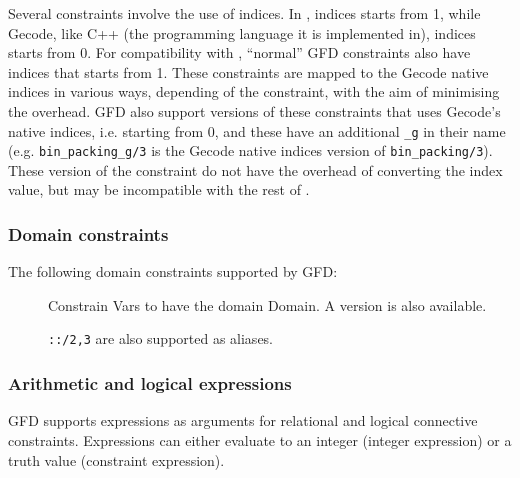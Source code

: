 Several constraints involve the use of indices. In \eclipse, indices starts
from 1, while Gecode, like C++ (the programming language it is implemented in), indices starts from 0. For compatibility 
with \eclipse, ``normal'' GFD constraints also have indices
that starts from 1. These constraints are mapped to the Gecode native 
indices in various ways, depending of the constraint, with the aim of 
minimising the overhead. GFD also support versions of these constraints that 
uses Gecode's native indices, i.e. starting from 0, and these have an 
additional {\tt _g} in their name (e.g. {\tt bin_packing_g/3} is the Gecode native
indices version of {\tt bin_packing/3}). These version of the constraint do not
have the overhead of converting the index value, but may be
incompatible with the rest of \eclipse.

\subsubsection{Domain constraints}

The following domain constraints supported by GFD:

\begin{description}
\item[]
Constrain Vars to have the domain Domain. A  version is also available.

\verb'::/2,3' are also supported as aliases.

\end{description}

  
\subsubsection{Arithmetic and logical expressions}

GFD supports expressions as arguments for relational and logical connective
constraints. Expressions can either evaluate to an integer (integer 
expression) or a truth value (constraint expression).

